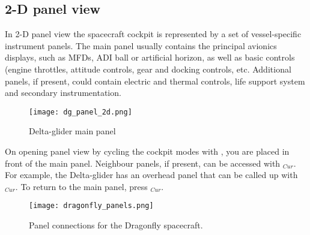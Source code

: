 \documentclass[Orbiter User Manual.tex]{subfiles}
\begin{document}
\subsection{2-D panel view}
In 2-D panel view the spacecraft cockpit is represented by a set of vessel-specific instrument panels. The main panel usually contains the principal avionics displays, such as MFDs, ADI ball or artificial horizon, as well as basic controls (engine throttles, attitude controls, gear and docking controls, etc. Additional panels, if present, could contain electric and thermal controls, life support system and secondary instrumentation.

\begin{figure}[H]
  \centering
  \texttt{[image: dg\_panel\_2d.png]}
  \caption{Delta-glider main panel}
\end{figure}

\noindent
On opening panel view by cycling the cockpit modes with , you are placed in front of the main panel. Neighbour panels, if present, can be accessed with \Ctrl\DArrow\UArrow\LArrow\RArrow$_{Cur}$. For example, the Delta-glider has an overhead panel that can be called up with \Ctrl\UArrow$_{Cur}$. To return to the main panel, press \Ctrl\DArrow$_{Cur}$.

\begin{figure}[H]
  \centering
  \texttt{[image: dragonfly\_panels.png]}
  \caption{Panel connections for the Dragonfly spacecraft.}
\end{figure}
\end{document}
